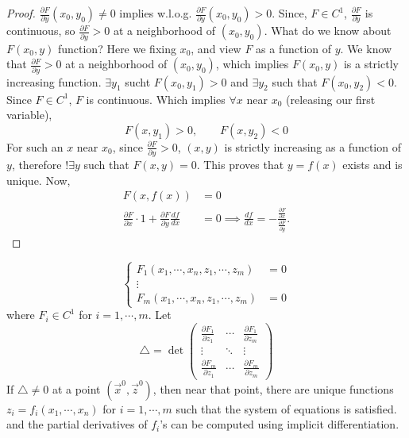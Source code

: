 \begin{proof}
    $\frac{\partial F}{\partial y}(x_0,y_0)\neq 0$ implies w.l.o.g. $\frac{\partial F}{\partial y}(x_0,y_0)>0$.
    Since, $F\in C^1$, $\frac{\partial F}{\partial y}$ is continuous, so $\frac{\partial F}{\partial y}>0$ 
    at a neighborhood of $(x_0,y_0)$. What do we know about $F(x_0,y)$ function? Here we fixing $x_0$,
    and view $F$ as a function of $y$. We know that $\frac{\partial F}{\partial y}>0$ at a neighborhood of $(x_0,y_0)$, which implies
    $F(x_0,y)$ is a strictly increasing function. $\exists y_1$ sucht $F(x_0,y_1)>0$ and $\exists y_2$ such that $F(x_0,y_2)<0$.
    Since $F\in C^1$, $F$ is continuous. Which implies $\forall x$ near $x_0$ (releasing our first variable),
    \[ F(x,y_1)>0, \qquad F(x,y_2)<0\]
    For such an $x$ near $x_0$, since $\frac{\partial F}{\partial y}>0$, $(x,y)$ is strictly increasing as a function of $y$, therefore $! \exists y$ such that $F(x,y)=0$.
    This proves that $y=f(x)$ exists and is unique. Now,
    \begin{align*}
        F(x,f(x))&=0\\
        \frac{\partial F}{\partial x} \cdot 1+ \frac{\partial F}{\partial y} \frac{d f}{d x} &= 0
        \implies \frac{d f}{d x} = -\frac{\frac{\partial F}{\partial x}}{\frac{\partial F}{\partial y}}.
    \end{align*}
\end{proof}
\begin{theorem}
    $$
    \begin{cases}
        F_1(x_1,\cdots,x_n,z_1,\cdots,z_m)&=0\\
        \vdots\\
        F_m(x_1,\cdots,x_n,z_1,\cdots,z_m)&=0
    \end{cases}
    $$
    where $F_i\in C^1$ for $i=1,\cdots,m$. Let 
\[\triangle=\det\begin{pmatrix}
\frac{\partial F_1}{\partial z_1} & \cdots & \frac{\partial F_1}{\partial z_m}\\
\vdots & \ddots & \vdots\\
\frac{\partial F_m}{\partial z_1} & \cdots & \frac{\partial F_m}{\partial z_m}
\end{pmatrix}\]
If $\triangle\neq 0$ at a point $(\vec x^0,\vec z^0)$, then near that point, there are unique functions $z_i = f_i(x_1,\cdots,x_n)$ for $i=1,\cdots,m$ such that the system of equations is satisfied.
and the partial derivatives of $f_i$'s can be computed using implicit differentiation.
\end{theorem}

